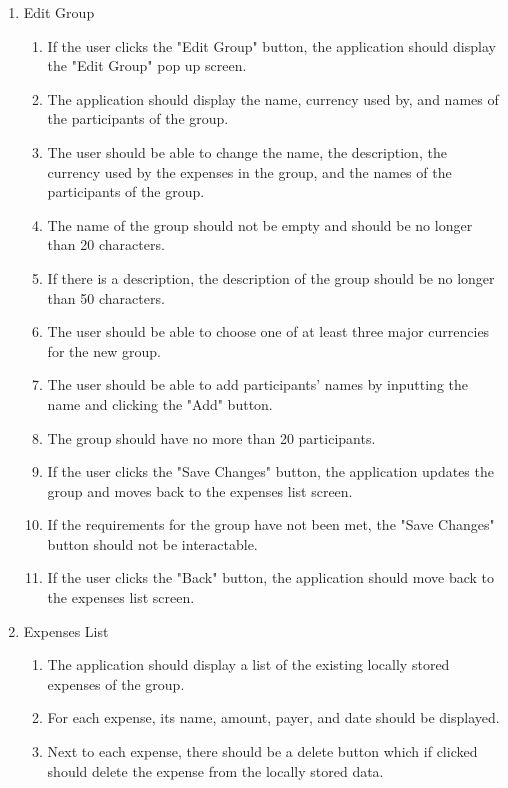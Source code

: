 \documentclass[conference]{IEEEtran}
\begin{document}
\begin{enumerate}
\begin{enumerate}
                \item Edit Group
                    \begin{enumerate}
                        \item If the user clicks the "Edit Group" button, the application should display the "Edit Group" pop up screen.
                        \item The application should display the name, currency used by, and names of the participants of the group.
                        \item The user should be able to change the name, the description, the currency used by the expenses in the group, and the names of the participants of the group.
                        \item The name of the group should not be empty and should be no longer than 20 characters.
                        \item If there is a description, the description of the group should be no longer than 50 characters.
                        \item The user should be able to choose one of at least three major currencies for the new group.
                        \item The user should be able to add participants' names by inputting the name and clicking the "Add" button.
                        \item The group should have no more than 20 participants.
                        \item If the user clicks the "Save Changes" button, the application updates the group and moves back to the expenses list screen.
                        \item If the requirements for the group have not been met, the "Save Changes" button should not be interactable.
                        \item If the user clicks the "Back" button, the application should move back to the expenses list screen.
                    \end{enumerate}
                \item Expenses List
                    \begin{enumerate}
                        \item The application should display a list of the existing locally stored expenses of the group.
                        \item For each expense, its name, amount, payer, and date should be displayed.
                        \item Next to each expense, there should be a delete button which if clicked should delete the expense from the locally stored data.

\end{enumerate}
\end{enumerate}
\end{enumerate}
\end{document}
